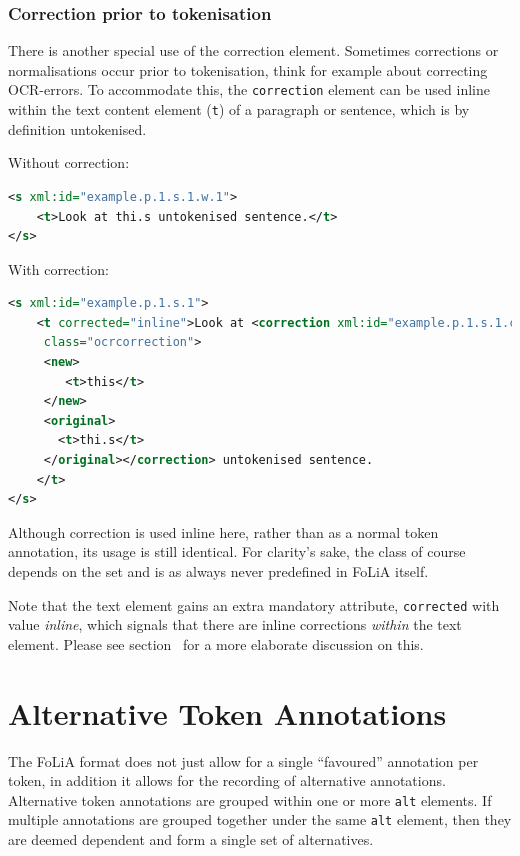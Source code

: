 \documentclass[a4paper,12pt]{report}
\begin{document}
\subsubsection{Correction prior to tokenisation} 
\label{sec:pretokcorrection}

There is another special use of the correction element. Sometimes corrections or normalisations occur prior to tokenisation, think for example about correcting OCR-errors. To accommodate this, the \texttt{correction} element can be used inline within the text content element (\texttt{t}) of a paragraph or sentence, which is by definition untokenised.

Without correction:

\begin{lstlisting}[language=xml]
<s xml:id="example.p.1.s.1.w.1">
    <t>Look at thi.s untokenised sentence.</t>
</s>            
\end{lstlisting}

With correction:

\begin{lstlisting}[language=xml]
<s xml:id="example.p.1.s.1">
    <t corrected="inline">Look at <correction xml:id="example.p.1.s.1.c.1"
     class="ocrcorrection">
     <new>
        <t>this</t>
     </new>
     <original>
       <t>thi.s</t>
     </original></correction> untokenised sentence.
    </t>
</s>                         
\end{lstlisting}

Although correction is used inline here, rather than as a normal token annotation, its usage is still identical. For clarity's sake, the class of course depends on the set and is as always never predefined in FoLiA itself.

Note that the text element gains an extra mandatory attribute, \texttt{corrected} with value \emph{inline}, which signals that there are inline corrections \emph{within} the text element. Please see section~\label{sec:textcontent} for a more elaborate discussion on this.


\section{Alternative Token Annotations}
\label{sec:alternatives}

The FoLiA format does not just allow for a single ``favoured'' annotation per token, in addition it allows for the recording of alternative annotations. Alternative token annotations are grouped within one or more \texttt{alt} elements. If multiple annotations are grouped together under the same \texttt{alt} element, then they are deemed dependent and form a single set of alternatives.
\end{document}
